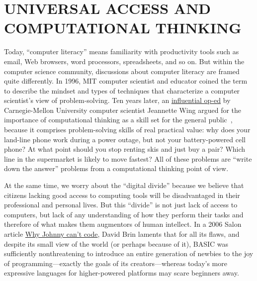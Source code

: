 
\section{UNIVERSAL ACCESS AND COMPUTATIONAL THINKING}



Today, ``computer
literacy'' means familiarity with 
productivity tools such as email, Web browsers, word processors,
spreadsheets, and so on.  
But within the computer science community, discussions about computer
literacy are framed quite differently.  
In 1996, MIT computer scientist and educator
 coined the term  to
describe the mindset and types of techniques that
characterize a computer scientist's view of problem-solving.
Ten years later, an
\href{http://www.cs.cmu.edu/afs/cs/usr/wing/www/publications/Wing06.pdf}{influential op-ed} by Carnegie-Mellon University computer scientist
Jeannette Wing argued for the importance of computational thinking as a
skill set for the general 
public~\cite{wing_computational_thinking}, because it comprises
problem-solving skills of real practical value: why does your land-line
phone work during a power outage, but not your battery-powered cell phone?  At
what point should you stop renting skis and just buy a pair?  Which line
in the supermarket is likely to move fastest?  All of these problems are
``write down the answer'' problems from a computational thinking point
of view.

At the same time, we worry about the ``digital divide''
because we believe that citizens lacking good access to
computing tools will be disadvantaged in their professional and personal
lives.  But this ``divide'' is not just lack of access to computers, but lack
of any understanding of how they perform their tasks and therefore of
what makes them augmentors of human intellect.
In a 2006 Salon article \href{www.salon.com/2006/09/14/basic_2}{Why Johnny
  can't code},
David Brin laments that for
all its flaws, and despite its small view of the world (or perhaps
because of it), BASIC was sufficiently
nonthreatening to introduce an entire generation of newbies
to the joy of programming---exactly
the goals of its creators---whereas today's more expressive languages
for higher-powered platforms may scare beginners away.

